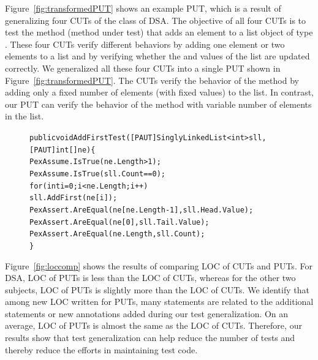 Figure~\ref{fig:transformedPUT} shows an example PUT, which is a result of generalizing four CUTs of the  class of DSA. The objective of all four CUTs is to test the  method (method under test) that adds an element to a list object of type . These four CUTs verify different behaviors by adding one element or two elements to a list and by verifying whether the  and  values of the list are updated correctly. We generalized all these four CUTs into a single PUT shown in Figure~\ref{fig:transformedPUT}. The CUTs verify the behavior of the  method by adding only a fixed number of elements (with fixed values) to the list. In contrast, our PUT can verify the behavior of the  method with variable number of elements in the list. 

\begin{figure}[t]
\begin{CodeOut}
\begin{alltt}
public void AddFirstTest([PAUT]SinglyLinkedList<int> sll, 
\hspace*{0.6in}[PAUT]int[] ne) \{            
\hspace*{0.2in}PexAssume.IsTrue(ne.Length > 1);
\hspace*{0.2in}PexAssume.IsTrue(sll.Count == 0);
\hspace*{0.2in}for (int i = 0; i < ne.Length; i++)
\hspace*{0.4in}sll.AddFirst(ne[i]);
\hspace*{0.2in}PexAssert.AreEqual(ne[ne.Length - 1], sll.Head.Value);            
\hspace*{0.2in}PexAssert.AreEqual(ne[0], sll.Tail.Value);
\hspace*{0.2in}PexAssert.AreEqual(ne.Length, sll.Count);
\}
\end{alltt}
\end{CodeOut}\vspace*{-4ex}
 \vspace*{-3ex}
\end{figure}

Figure~\ref{fig:loccomp} shows the results of comparing LOC of CUTs and PUTs. For DSA, LOC of PUTs is less than the LOC of CUTs, whereas for the other two subjects, LOC of PUTs is slightly more than the LOC of CUTs. We identify that among new LOC written for PUTs, many statements are related to the additional  statements or new annotations added during our test generalization. On an average, LOC of PUTs is almost the same as the LOC of CUTs. Therefore, our results show that test generalization can help reduce the number of tests and thereby reduce the efforts in maintaining test code.

